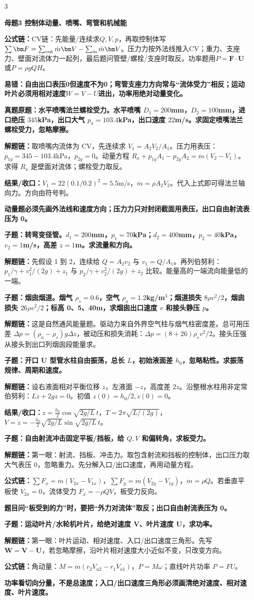 \documentclass[a4paper]{article}
\newcommand{\mt}[1]{\vspace{0.22pt}\colorbox{M}{\parbox{\dimexpr\linewidth-2\fboxsep}{\color{white}\bfseries #1}}\par}
\newcommand{\qt}[1]{\vspace{0.10pt}\colorbox{Q}{\parbox{\dimexpr\linewidth-2\fboxsep}{\color{white}\bfseries #1}}\par}
\newcommand{\warn}[1]{\colorbox{Y}{\parbox{\dimexpr\linewidth-2\fboxsep}{\color{E}\bfseries #1}}\par}
\newcommand{\chain}[1]{{\color{A}\bfseries 解题链：}#1\par}
\newcommand{\res}[1]{{\color{E}\bfseries 结果/收口：}#1\par}
\newcommand{\form}[1]{{\color{M}\bfseries 公式链：}#1\par}
\begin{document}
\begin{multicols}{3}
\mt{母题3 控制体动量、喷嘴、弯管和机械能}
\form{CV链：先能量/连续求$Q,V,p$，再取控制体写$\sum\bm F=\sum_{\rm out}\dot m\bm V-\sum_{\rm in}\dot m\bm V$。压力力按外法线推入CV；重力、支座力、壁面对流体力一起列，最后题问管壁/螺栓/支座时取反。功率题用$P=\bm F\cdot\bm U$或$P=\rho gQH$。}
\warn{易错：自由出口表压0但速度不为0；弯管支座力方向常与“流体受力”相反；运动叶片必须用相对速度$W=V-U$进出，功率用绝对动量变化。}
\qt{真题原题：水平喷嘴法兰螺栓受力。水平喷嘴 $D_1=200$mm，$D_2=100$mm，进口绝压 $345$kPa，出口大气 $p_a=103.4$kPa，出口速度 $22$m/s。求固定喷嘴法兰螺栓受力，忽略摩擦。}
\chain{取喷嘴内流体为 CV，先连续求 $V_1=A_2V_2/A_1$。压力用表压：$p_{1g}=345-103.4$kPa，$p_{2g}=0$。动量方程 $R_x+p_{1g}A_1-p_{2g}A_2=\dot m(V_2-V_1)$。求得 $R_x$ 是壁面对流体；螺栓受力取反。}
\res{$V_1=22(0.1/0.2)^2=5.5$m/s，$\dot m=\rho A_2V_2$。代入上式即可得法兰轴向力。方向由符号判。}
\warn{动量题必须先画外法线和速度方向；压力力只对封闭截面用表压，出口自由射流表压为 0。}

\qt{子题：转弯变径管。$d_1=200$mm，$p_1=70$kPa；$d_2=400$mm，$p_2=40$kPa，$v_2=1$m/s，高差 $z=1$m。求流量和方向。}
\chain{先假设 1 到 2，连续给 $Q=A_2v_2$ 与 $v_1=Q/A_1$。再列伯努利：$p_1/\gamma+v_1^2/(2g)+z_1$ 与 $p_2/\gamma+v_2^2/(2g)+z_2$ 比较。能量高的一端流向能量低的一端。}

\qt{子题：烟囱烟道。烟气 $\rho_s=0.6$，空气 $\rho_a=1.2$kg/m$^3$；烟道损失 $8\rho v^2/2$，烟囱损失 $26\rho v^2/2$；标高 0、5、40m，求烟囱出口速度 $v$ 和接头静压 $p$。}
\chain{这是自然通风能量题。驱动力来自外界空气柱与烟气柱密度差。总可用压差 $\Delta p=(\rho_a-\rho_s)g\Delta z$，被动压和损失消耗：$\Delta p=(8+26)\rho_s v^2/2$。接头压强从接头到出口列烟囱段能量求。}

\qt{子题：开口 U 型管水柱自由振荡，总长 $L$，初始液面差 $h_0$，忽略粘性。求振荡规律、周期和速度。}
\chain{设右液面相对平衡位移 $z$，左液面 $-z$，高度差 $2z$。沿整根水柱用非定常伯努利：$L\ddot z+2gz=0$。初值 $z(0)=h_0/2,\dot z(0)=0$。}
\res{$z=\frac{h_0}{2}\cos\sqrt{2g/L}\,t$，$T=2\pi\sqrt{L/(2g)}$，$V=\dot z=-\frac{h_0}{2}\sqrt{2g/L}\sin\sqrt{2g/L}\,t$。}

\qt{子题：自由射流冲击固定平板/挡板，给 $Q,V$ 和偏转角，求板受力。}
\chain{第一眼：射流、挡板、冲击力。取包含射流和挡板的控制体，出口压力取大气表压 0，忽略重力。先分解入口/出口速度，再用动量方程。}
\form{$\sum F_x=\dot m(V_{2x}-V_{1x})$，$\sum F_y=\dot m(V_{2y}-V_{1y})$，$\dot m=\rho Q$。若垂直平板使 $V_{2x}=0$，流体受力 $F_x=-\rho QV$，板受力反向。}
\warn{题目问“板受到的力”时，要把“外力对流体”取反；出口自由射流表压为 0。}

\qt{子题：运动叶片/水轮机叶片，给绝对速度 $\bm V$、叶片速度 $\bm U$，求功率。}
\chain{第一眼：叶片运动、相对速度、入口/出口速度三角形。先写 $\bm W=\bm V-\bm U$，若忽略摩擦，沿叶片相对速度大小近似不变，只改变方向。}
\form{角动量：$M=\dot m(r_2V_{u2}-r_1V_{u1})$，$P=M\omega$；直线叶片功率 $P=FU$。}
\warn{功率看切向分量，不是总速度；入口/出口速度三角形必须画清绝对速度、相对速度、叶片速度。}


\end{multicols}
\end{document}
